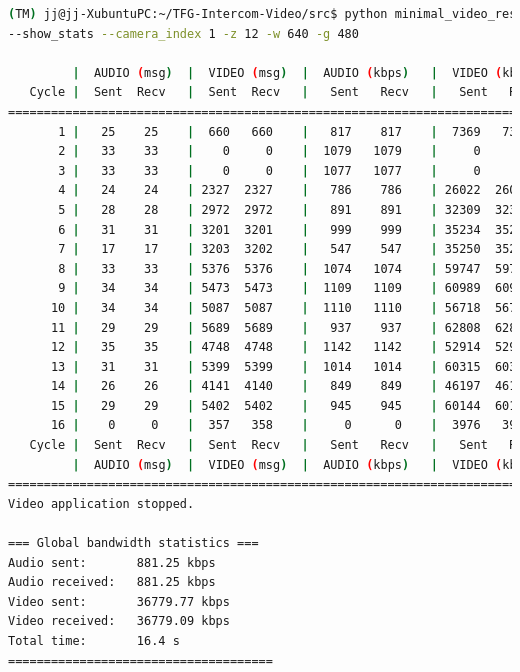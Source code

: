 \begin{lstlisting}[language=bash,basicstyle=\ttfamily\tiny]
(TM) jj@jj-XubuntuPC:~/TFG-Intercom-Video/src$ python minimal_video_resolution.py --show_video
--show_stats --camera_index 1 -z 12 -w 640 -g 480

         |  AUDIO (msg)  |  VIDEO (msg)  |  AUDIO (kbps)   |  VIDEO (kbps)   |     CPU (%) 
   Cycle |  Sent  Recv   |  Sent  Recv   |   Sent   Recv   |   Sent   Recv   | Program System
================================================================================================
       1 |   25    25    |  660   660    |   817    817    |  7369   7369    |  44      0       
       2 |   33    33    |    0     0    |  1079   1079    |     0      0    |  47     70       
       3 |   33    33    |    0     0    |  1077   1077    |     0      0    |  45     73       
       4 |   24    24    | 2327  2327    |   786    786    | 26022  26022    |  36     69       
       5 |   28    28    | 2972  2972    |   891    891    | 32309  32309    |  35     68       
       6 |   31    31    | 3201  3201    |   999    999    | 35234  35234    |  38     71       
       7 |   17    17    | 3203  3202    |   547    547    | 35250  35239    |  38     70       
       8 |   33    33    | 5376  5376    |  1074   1074    | 59747  59747    |  55     74       
       9 |   34    34    | 5473  5473    |  1109   1109    | 60989  60989    |  55     73       
      10 |   34    34    | 5087  5087    |  1110   1110    | 56718  56718    |  62     72       
      11 |   29    29    | 5689  5689    |   937    937    | 62808  62808    |  60     69       
      12 |   35    35    | 4748  4748    |  1142   1142    | 52914  52914    |  64     73       
      13 |   31    31    | 5399  5399    |  1014   1014    | 60315  60315    |  68     74       
      14 |   26    26    | 4141  4140    |   849    849    | 46197  46186    |  53     66       
      15 |   29    29    | 5402  5402    |   945    945    | 60144  60144    |  56     71       
      16 |    0     0    |  357   358    |     0      0    |  3976   3987    |   0     14       
   Cycle |  Sent  Recv   |  Sent  Recv   |   Sent   Recv   |   Sent   Recv   | Program System
         |  AUDIO (msg)  |  VIDEO (msg)  |  AUDIO (kbps)   |  VIDEO (kbps)   |     CPU (%) 
===========================================================================================
Video application stopped.

=== Global bandwidth statistics ===
Audio sent:       881.25 kbps
Audio received:   881.25 kbps
Video sent:       36779.77 kbps
Video received:   36779.09 kbps
Total time:       16.4 s
=====================================
\end{lstlisting}

